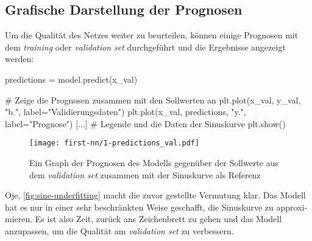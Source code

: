 \subsection{Grafische Darstellung der Prognosen}
Um die Qualität des Netzes weiter zu beurteilen, können einige
Prognosen mit dem \textit{training} oder \textit{validation set}
durchgeführt und die Ergebnisse angezeigt werden:
\begin{pythoncode}
predictions = model.predict(x_val)

# Zeige die Prognosen zusammen mit den Sollwerten an
plt.plot(x_val, y_val, "b.", label="Validierungsdaten")
plt.plot(x_val, predictions, "y.", label="Prognose")
[...] # Legende und die Daten der Sinuskurve
plt.show()
\end{pythoncode}
\begin{figure}[h!]
  \centering
  \texttt{[image: first-nn/1-predictions\_val.pdf]}
  \caption{Ein Graph der Prognosen des Modells gegenüber der Sollwerte aus dem
  \textit{validation set} zusammen mit der Sinuskurve als Referenz}
  \label{fig:sine-underfitting}
\end{figure}
Oje, \autoref{fig:sine-underfitting} macht die zuvor gestellte Vermutung klar.
Das Modell hat es nur in einer sehr beschränkten Weise
geschafft, die Sinuskurve zu ap­pro­xi­mie­ren.
Es ist also Zeit, zurück ans Zeichenbrett zu gehen und
das Modell anzupassen, um die Qualität am \textit{validation set}
zu verbessern.

